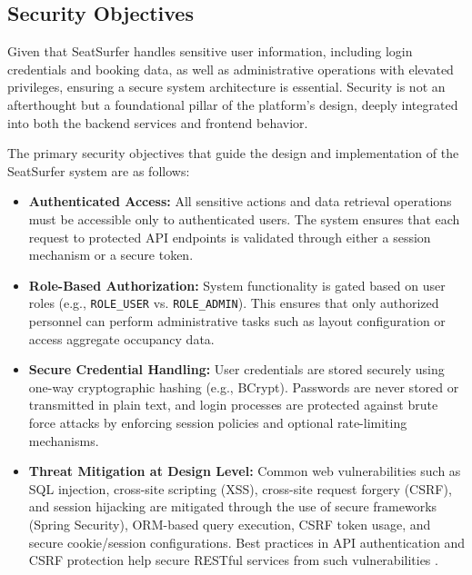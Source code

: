 \documentclass[12pt,a4paper]{report} %
\begin{document}
\subsection{Security Objectives}

Given that SeatSurfer handles sensitive user information, including login credentials and booking data, as well as administrative operations with elevated privileges, ensuring a secure system architecture is essential. Security is not an afterthought but a foundational pillar of the platform's design, deeply integrated into both the backend services and frontend behavior.

The primary security objectives that guide the design and implementation of the SeatSurfer system are as follows:

\begin{itemize}
    \item \textbf{Authenticated Access:} All sensitive actions and data retrieval operations must be accessible only to authenticated users. The system ensures that each request to protected API endpoints is validated through either a session mechanism or a secure token.
    
    \item \textbf{Role-Based Authorization:} System functionality is gated based on user roles (e.g., \verb|ROLE_USER| vs. \verb|ROLE_ADMIN|). This ensures that only authorized personnel can perform administrative tasks such as layout configuration or access aggregate occupancy data.
    
    \item \textbf{Secure Credential Handling:} User credentials are stored securely using one-way cryptographic hashing (e.g., BCrypt). Passwords are never stored or transmitted in plain text, and login processes are protected against brute force attacks by enforcing session policies and optional rate-limiting mechanisms.
    
    \item \textbf{Threat Mitigation at Design Level:} Common web vulnerabilities such as SQL injection, cross-site scripting (XSS), cross-site request forgery (CSRF), and session hijacking are mitigated through the use of secure frameworks (Spring Security), ORM-based query execution, CSRF token usage, and secure cookie/session configurations. Best practices in API authentication and CSRF protection help secure RESTful services from such vulnerabilities \cite{sharma2023privacy}.
\end{itemize}
\end{document}
